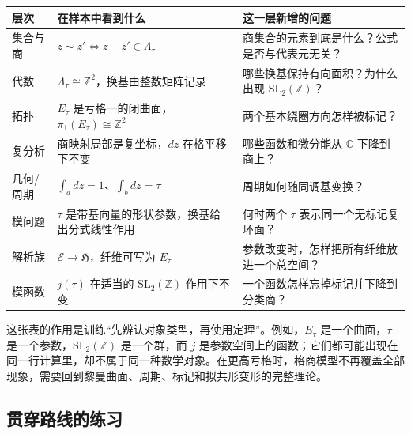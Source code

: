 \documentclass[UTF8,fontset=none,a4paper,11pt]{ctexart}
\theoremstyle{foundation-definition}
\theoremstyle{foundation-theorem}
\theoremstyle{foundation-proposition}
\theoremstyle{foundation-example}
\theoremstyle{foundation-remark}
\theoremstyle{foundation-theorem}
\begin{document}
\begin{center}
{\small
\begin{longtable}{p{}p{}p{}}
\toprule
层次 & 在样本中看到什么 & 这一层新增的问题 \\
\midrule
集合与商 & \(z\sim z'\Longleftrightarrow z-z'\in\Lambda_\tau\) & 商集合的元素到底是什么？公式是否与代表元无关？ \\
代数 & \(\Lambda_\tau\cong\mathbb Z^2\)，换基由整数矩阵记录 & 哪些换基保持有向面积？为什么出现 \(\mathrm{SL}_2(\mathbb Z)\)？ \\
拓扑 & \(E_\tau\) 是亏格一的闭曲面，\(\pi_1(E_\tau)\cong\mathbb Z^2\) & 两个基本绕圈方向怎样被标记？ \\
复分析 & 商映射局部是复坐标，\(dz\) 在格平移下不变 & 哪些函数和微分能从 \(\mathbb C\) 下降到商上？ \\
几何/周期 & \(\int_a dz=1\)、\(\int_b dz=\tau\) & 周期如何随同调基变换？ \\
模问题 & \(\tau\) 是带基向量的形状参数，换基给出分式线性作用 & 何时两个 \(\tau\) 表示同一个无标记复环面？ \\
解析族 & \(\mathcal E\to\mathfrak H\)，纤维可写为 \(E_\tau\) & 参数改变时，怎样把所有纤维放进一个总空间？ \\
模函数 & \(j(\tau)\) 在适当的 \(\mathrm{SL}_2(\mathbb Z)\) 作用下不变 & 一个函数怎样忘掉标记并下降到分类商？ \\
\bottomrule
\end{longtable}}
\end{center}

这张表的作用是训练“先辨认对象类型，再使用定理”。例如，\(E_\tau\) 是一个曲面，\(\tau\) 是一个参数，\(\mathrm{SL}_2(\mathbb Z)\) 是一个群，而 \(j\) 是参数空间上的函数；它们都可能出现在同一行计算里，却不属于同一种数学对象。在更高亏格时，格商模型不再覆盖全部现象，需要回到黎曼曲面、周期、标记和拟共形变形的完整理论。

\subsection{贯穿路线的练习}
\end{document}

